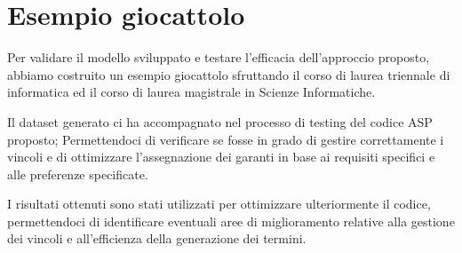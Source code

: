 \section{Esempio giocattolo}
\label{sec:esempio-giocattolo}

Per validare il modello sviluppato e testare l’efficacia dell’approccio proposto,
abbiamo costruito un esempio giocattolo sfruttando il corso di laurea triennale di informatica
ed il corso di laurea magistrale in Scienze Informatiche.

Il dataset generato ci ha accompagnato nel processo di testing del codice ASP proposto;
Permettendoci di verificare se fosse in grado di gestire correttamente i vincoli e
di ottimizzare l'assegnazione dei garanti in base ai requisiti specifici e alle preferenze specificate.

I risultati ottenuti sono stati utilizzati per ottimizzare ulteriormente il codice,
permettendoci di identificare eventuali aree di miglioramento relative alla gestione
dei vincoli e all'efficienza della generazione dei termini.